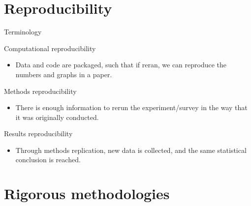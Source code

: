 \documentclass[
  ignorenonframetext,
]{beamer}
\providecommand{\tightlist}{%
  \setlength{\itemsep}{0pt}\setlength{\parskip}{0pt}}
\begin{document}
\hypertarget{reproducibility}{%
\section{Reproducibility}\label{reproducibility}}

\begin{frame}{Terminology}
\protect\hypertarget{terminology}{}

\begin{block}{Computational reproducibility}

\begin{itemize}[<+->]
\tightlist
\item
  Data and code are packaged, such that if reran, we can reproduce the
  numbers and graphs in a paper.
\end{itemize}

\end{block}

\begin{block}{Methods reproducibility}

\begin{itemize}[<+->]
\tightlist
\item
  There is enough information to rerun the experiment/survey in the way
  that it was originally conducted.
\end{itemize}

\end{block}

\begin{block}{Results reproducibility}

\begin{itemize}[<+->]
\tightlist
\item
  Through methods replication, new data is collected, and the same
  statistical conclusion is reached.
\end{itemize}

\end{block}

\end{frame}

\hypertarget{rigorous-methodologies}{%
\section{Rigorous methodologies}\label{rigorous-methodologies}}
\end{document}
